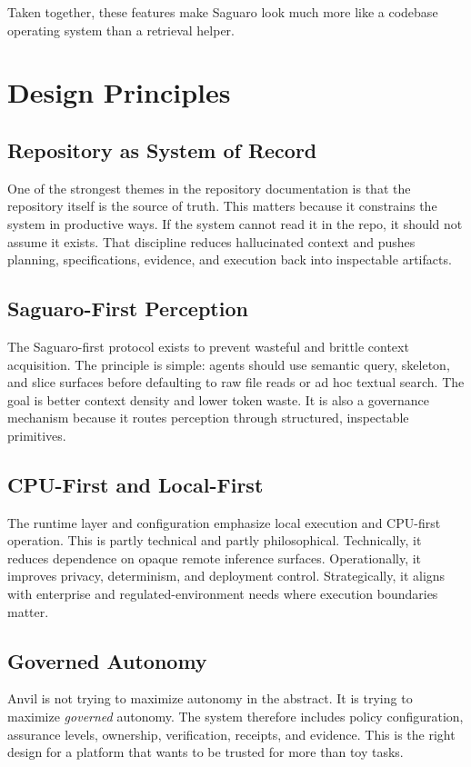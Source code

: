 \documentclass[11pt,a4paper]{article}
\begin{document}
Taken together, these features make Saguaro look much more like a codebase operating system than a retrieval helper.

\section{Design Principles}
\subsection{Repository as System of Record}
One of the strongest themes in the repository documentation is that the repository itself is the source of truth. This matters because it constrains the system in productive ways. If the system cannot read it in the repo, it should not assume it exists. That discipline reduces hallucinated context and pushes planning, specifications, evidence, and execution back into inspectable artifacts.

\subsection{Saguaro-First Perception}
The Saguaro-first protocol exists to prevent wasteful and brittle context acquisition. The principle is simple: agents should use semantic query, skeleton, and slice surfaces before defaulting to raw file reads or ad hoc textual search. The goal is better context density and lower token waste. It is also a governance mechanism because it routes perception through structured, inspectable primitives.

\subsection{CPU-First and Local-First}
The runtime layer and configuration emphasize local execution and CPU-first operation. This is partly technical and partly philosophical. Technically, it reduces dependence on opaque remote inference surfaces. Operationally, it improves privacy, determinism, and deployment control. Strategically, it aligns with enterprise and regulated-environment needs where execution boundaries matter.

\subsection{Governed Autonomy}
Anvil is not trying to maximize autonomy in the abstract. It is trying to maximize \emph{governed} autonomy. The system therefore includes policy configuration, assurance levels, ownership, verification, receipts, and evidence. This is the right design for a platform that wants to be trusted for more than toy tasks.
\end{document}
